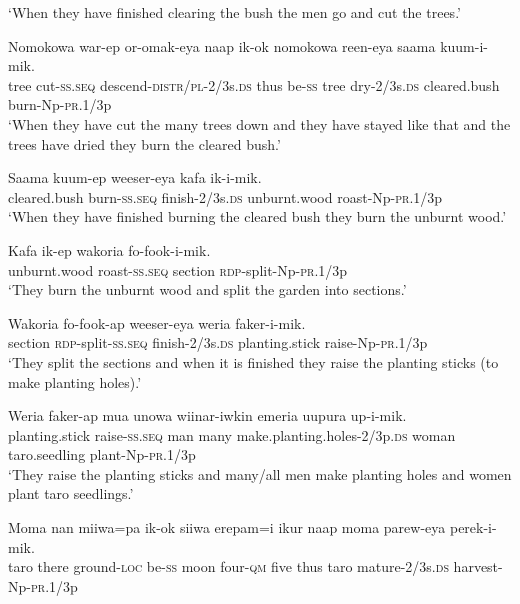 \glt ‘When they have finished clearing the bush the men go and cut the trees.’ \\
\z


\ea
\gll  Nomokowa  war-ep  or-omak-eya  naap  ik-ok  nomokowa     reen-eya  saama  kuum-i-mik. \\
tree  cut-\textsc{ss.seq}  descend-\textsc{distr}/\textsc{pl}-2/3s.\textsc{ds}  thus  be-\textsc{ss}  tree  dry-2/3s.\textsc{ds}  cleared.bush  burn-Np-\textsc{pr}.1/3p \\


\glt ‘When they have cut the many trees down and they have stayed like that and the trees have dried they burn the cleared bush.’ \\
\z


\ea
\gll  Saama  kuum-ep  weeser-eya  kafa  ik-i-mik. \\
cleared.bush  burn-\textsc{ss.seq}  finish-2/3s.\textsc{ds}  unburnt.wood  roast-Np-\textsc{pr}.1/3p \\
\glt ‘When they have finished burning the cleared bush they burn the unburnt wood.’ \\
\z


\ea
\gll  Kafa  ik-ep  wakoria  fo-fook-i-mik. \\
unburnt.wood  roast-\textsc{ss.seq}  section  \textsc{rdp}-split-Np-\textsc{pr}.1/3p \\
\glt ‘They burn the unburnt wood and split the garden into sections.’ \\
\z


\ea
\gll  Wakoria  fo-fook-ap  weeser-eya  weria  faker-i-mik. \\
section  \textsc{rdp}-split-\textsc{ss.seq}  finish-2/3s.\textsc{ds}  planting.stick  raise-Np-\textsc{pr}.1/3p \\
\glt ‘They split the sections and when it is finished they raise the planting sticks (to make planting holes).’ \\
\z


\ea
\gll  Weria  faker-ap  mua  unowa  wiinar-iwkin  emeria                     uupura  up-i-mik. \\
planting.stick  raise-\textsc{ss.seq}  man  many  make.planting.holes-2/3p.\textsc{ds}  woman taro.seedling  plant-Np-\textsc{pr}.1/3p \\


\glt ‘They raise the planting sticks and many/all men make planting holes and women plant taro seedlings.’ \\
\z


\ea
\gll  Moma  nan  miiwa=pa  ik-ok  siiwa  erepam=i  ikur  naap  moma parew-eya  perek-i-mik. \\
taro  there  ground-\textsc{loc}  be-\textsc{ss}  moon  four-\textsc{qm}  five  thus  taro     mature-2/3s.\textsc{ds}  harvest-Np-\textsc{pr}.1/3p \\


